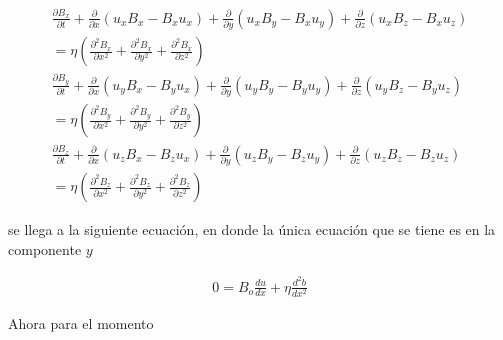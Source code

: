 \begin{eqnarray}
    \frac{\partial B_{x}}{\partial t} + \frac{\partial}{\partial x}\left(u_{x}B_{x}-B_{x}u_{x}\right)+\frac{\partial}{\partial y}\left(u_{x}B_{y}-B_{x}u_{y}\right)+\frac{\partial}{\partial z}\left(u_{x}B_{z}-B_{x}u_{z}\right) \nonumber \\
    =\eta\left(\frac{\partial^{2}B_{x}}{\partial x^{2}} +\frac{\partial^{2}B_{x}}{\partial y^{2}} +\frac{\partial^{2}B_{x}}{\partial z^{2}}\right)\\
    \frac{\partial B_{y}}{\partial t} + \frac{\partial}{\partial x}\left(u_{y}B_{x}-B_{y}u_{x}\right)+\frac{\partial}{\partial y}\left(u_{y}B_{y}-B_{y}u_{y}\right)+\frac{\partial}{\partial z}\left(u_{y}B_{z}-B_{y}u_{z}\right) \nonumber \\
    =\eta\left(\frac{\partial^{2}B_{y}}{\partial x^{2}} +\frac{\partial^{2}B_{y}}{\partial y^{2}} +\frac{\partial^{2}B_{y}}{\partial z^{2}}\right)\\
    \frac{\partial B_{z}}{\partial t} + \frac{\partial}{\partial x}\left(u_{z}B_{x}-B_{z}u_{x}\right)+\frac{\partial}{\partial y}\left(u_{z}B_{y}-B_{z}u_{y}\right)+\frac{\partial}{\partial z}\left(u_{z}B_{z}-B_{z}u_{z}\right) \nonumber \\
    =\eta\left(\frac{\partial^{2}B_{z}}{\partial x^{2}} +\frac{\partial^{2}B_{z}}{\partial y^{2}} +\frac{\partial^{2}B_{z}}{\partial z^{2}}\right)
\end{eqnarray}

\noindent se llega a la siguiente ecuación, en donde la única ecuación que se tiene es en la componente $y$

\begin{eqnarray}
    0=B_{o}\frac{du}{dx}+\eta\frac{d^{2}b}{dx^{2}}
\end{eqnarray}

Ahora para el momento 


